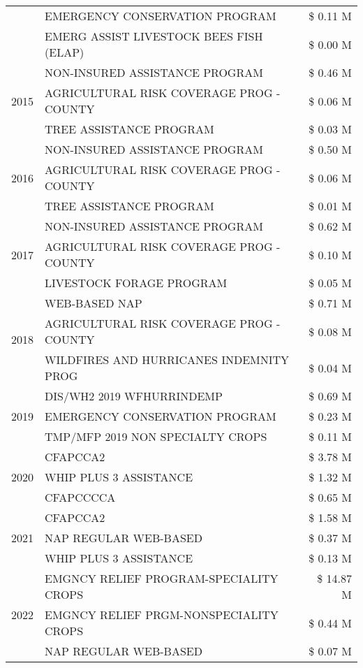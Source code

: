 \begin{tabular}{llr}
 & EMERGENCY CONSERVATION PROGRAM & \$ 0.11 M \\
 & EMERG ASSIST LIVESTOCK BEES FISH (ELAP) & \$ 0.00 M \\
\cline{1-3}
\multirow[t]{3}{*}{2015} & NON-INSURED ASSISTANCE PROGRAM & \$ 0.46 M \\
 & AGRICULTURAL RISK COVERAGE PROG - COUNTY & \$ 0.06 M \\
 & TREE ASSISTANCE PROGRAM & \$ 0.03 M \\
\cline{1-3}
\multirow[t]{3}{*}{2016} & NON-INSURED ASSISTANCE PROGRAM & \$ 0.50 M \\
 & AGRICULTURAL RISK COVERAGE PROG - COUNTY & \$ 0.06 M \\
 & TREE ASSISTANCE PROGRAM & \$ 0.01 M \\
\cline{1-3}
\multirow[t]{3}{*}{2017} & NON-INSURED ASSISTANCE PROGRAM & \$ 0.62 M \\
 & AGRICULTURAL RISK COVERAGE PROG - COUNTY & \$ 0.10 M \\
 & LIVESTOCK FORAGE PROGRAM & \$ 0.05 M \\
\cline{1-3}
\multirow[t]{3}{*}{2018} & WEB-BASED NAP & \$ 0.71 M \\
 & AGRICULTURAL RISK COVERAGE PROG - COUNTY & \$ 0.08 M \\
 & WILDFIRES AND HURRICANES INDEMNITY PROG & \$ 0.04 M \\
\cline{1-3}
\multirow[t]{3}{*}{2019} & DIS/WH2 2019 WFHURRINDEMP & \$ 0.69 M \\
 & EMERGENCY CONSERVATION PROGRAM & \$ 0.23 M \\
 & TMP/MFP 2019 NON SPECIALTY CROPS & \$ 0.11 M \\
\cline{1-3}
\multirow[t]{3}{*}{2020} & CFAPCCA2 & \$ 3.78 M \\
 & WHIP PLUS 3 ASSISTANCE & \$ 1.32 M \\
 & CFAPCCCCA & \$ 0.65 M \\
\cline{1-3}
\multirow[t]{3}{*}{2021} & CFAPCCA2 & \$ 1.58 M \\
 & NAP REGULAR WEB-BASED & \$ 0.37 M \\
 & WHIP PLUS 3 ASSISTANCE & \$ 0.13 M \\
\cline{1-3}
\multirow[t]{3}{*}{2022} & EMGNCY RELIEF PROGRAM-SPECIALITY CROPS & \$ 14.87 M \\
 & EMGNCY RELIEF PRGM-NONSPECIALITY CROPS & \$ 0.44 M \\
 & NAP REGULAR WEB-BASED & \$ 0.07 M \\
\cline{1-3}
\bottomrule
\end{tabular}
